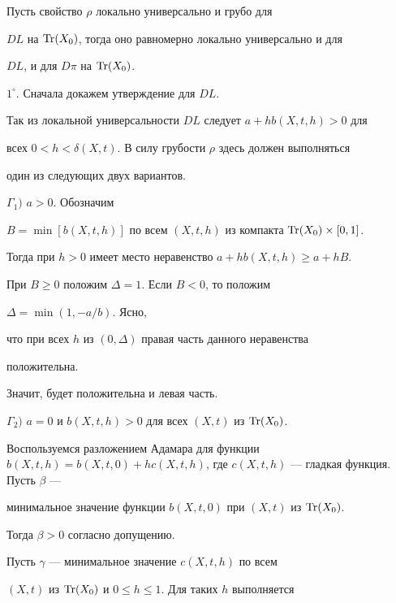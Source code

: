  


\begin{lem} 


Пусть свойство $\rho$ локально универсально и грубо для 


$D L$ на $\operatorname{Tr}(X_0)$, тогда оно равномерно локально универсально и для 


$D L$, и для $D\pi$ на $\operatorname{Tr}(X_0)$. 


\end{lem} 


 


\begin{pf} 


$1^\circ$. Сначала докажем утверждение для $D L$. 


Так из локальной универсальности $D L$ следует $a+h b(X,t,h)>0$ для 


всех $0<h<\delta(X,t)$. В силу грубости $\rho$ здесь должен выполняться 


один из следующих двух вариантов. 


 


$\Gamma_1)$ $a>0$. Обозначим 


$B=\min[b(X,t,h)]$ по всем $(X,t,h)$ из компакта $\operatorname{Tr}(X_0)\times[0,1]$. 


Тогда при $h>0$ имеет место неравенство $a+h b(X,t,h)\ge a+h B$. 


При $B\ge0$ положим $\Delta=1$. Если $B<0$, то положим 


$\Delta=\min(1,-a/b)$. Ясно, 


что при всех $h$ из $(0,\Delta)$ правая часть данного неравенства 


положительна. 


Значит, будет положительна и левая часть. 


 


$\Gamma_2)$ $a=0$ и $b(X,t,h)>0$ для всех $(X,t)$ из $\operatorname{Tr}(X_0)$. 


Воспользуемся разложением Адамара для функции $b(X,t,h)=b(X,t,0)+h 


c(X,t,h)$, где $c(X,t,h)$ --- гладкая функция. Пусть $\beta$ --- 


минимальное значение функции $b(X,t,0)$ при $(X,t)$ из $\operatorname{Tr}(X_0)$. 


Тогда $\beta>0$ согласно допущению. 


Пусть $\gamma$ --- минимальное значение $c(X,t,h)$ по всем 


$(X,t)$ из $\operatorname{Tr}(X_0)$ и $0\le h\le1$. Для таких $h$ выполняется 



\end{pf}
